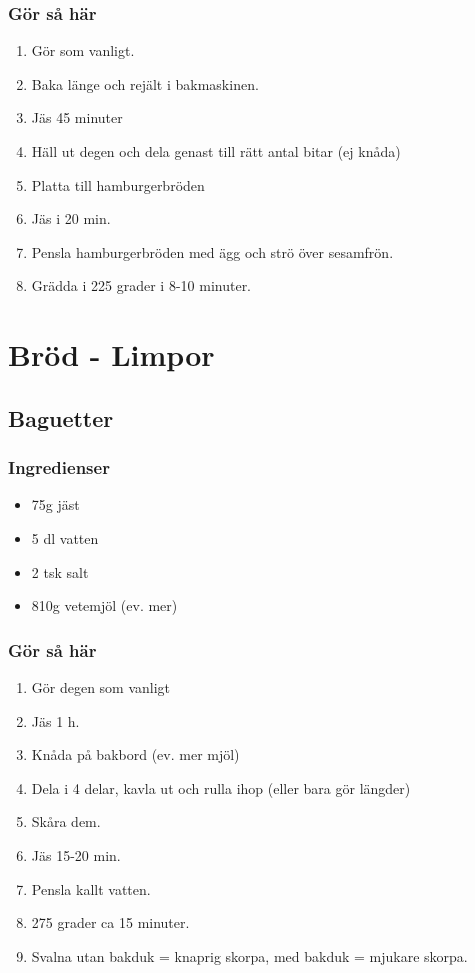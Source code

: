 \documentclass[a4paper,11pt,twocolumn]{article}
\begin{document}
\subsubsection*{Gör så här}
\begin{enumerate}[label=\arabic*.]
    \item Gör som vanligt.
    \item Baka länge och rejält i bakmaskinen.
    \item Jäs 45 minuter
    \item Häll ut degen och dela genast till rätt antal bitar (ej knåda)
    \item Platta till hamburgerbröden
    \item Jäs i 20 min.
    \item Pensla hamburgerbröden med ägg och strö över sesamfrön.
    \item Grädda i 225 grader i 8-10 minuter.
\end{enumerate}



\newpage
\section{Bröd - Limpor}


\subsection{Baguetter}
\subsubsection*{Ingredienser}
\begin{itemize}[noitemsep]
    \item 75g jäst
    \item 5 dl vatten
    \item 2 tsk salt
    \item 810g vetemjöl (ev. mer)
\end{itemize}
\subsubsection*{Gör så här}
\begin{enumerate}[label=\arabic*.]
    \item Gör degen som vanligt
    \item Jäs 1 h.
    \item Knåda på bakbord (ev. mer mjöl)
    \item Dela i 4 delar, kavla ut och rulla ihop (eller bara gör längder)
    \item Skåra dem.
    \item Jäs 15-20 min.
    \item Pensla kallt vatten.
    \item 275 grader ca 15 minuter.
    \item Svalna utan bakduk = knaprig skorpa, med bakduk = mjukare skorpa.
\end{enumerate}
\end{document}
